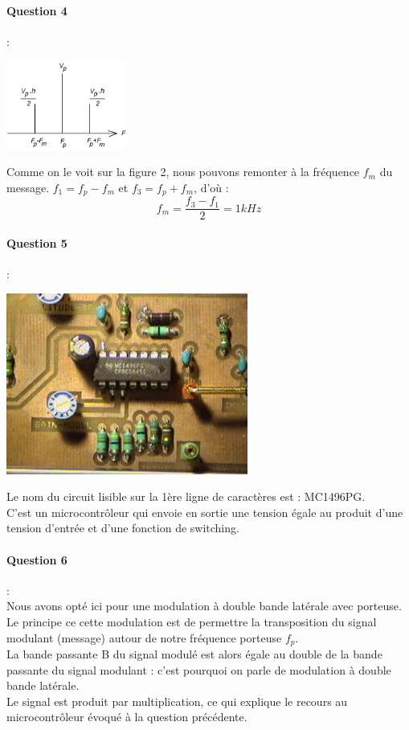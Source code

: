 \documentclass[french]{article}
\begin{document}
\paragraph{Question 4} : \\
\begin{center}
 \includegraphics[width=150px]{DM2_fig2.png}
 \end{center} 
Comme on le voit sur la figure 2, nous pouvons remonter à la fréquence $f_{m}$ du message.
$f_{1}=f_{p}-f_{m}$ et $f_{3}=f_{p}+f_{m}$, d'où :
\begin{equation*}
f_{m}=\frac{f_{3}-f_{1}}{2}=1kHz
\end{equation*}
\paragraph{Question 5} : \\
\begin{center}
\includegraphics[width=300px]{DM2_Q5.jpg} 
\end{center}
Le nom du circuit lisible sur la 1ère ligne de caractères est : MC1496PG. \\
C’est un microcontrôleur qui envoie en sortie une tension égale au produit d’une tension d’entrée et d’une fonction de switching.

\paragraph{Question 6} : \\
Nous avons opté ici pour une modulation à double bande latérale avec porteuse. Le principe ce cette modulation est de permettre la transposition du signal modulant (message) autour de notre fréquence porteuse $f_{p}$.\\ La bande passante B du signal modulé est alors égale au double de la bande passante du signal modulant : c'est pourquoi on parle de modulation à double bande latérale. \\
Le signal est produit par multiplication, ce qui explique le recours au microcontrôleur évoqué à la question précédente.\\
\end{document}
